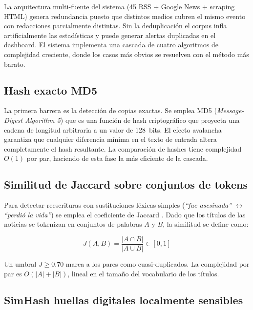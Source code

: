 La arquitectura multi-fuente del sistema (45 RSS + Google News + scraping HTML)
genera redundancia puesto que distintos medios cubren el mismo evento con
redacciones parcialmente distintas. Sin la deduplicación el corpus infla
artificialmente las estadísticas y puede generar alertas duplicadas en el dashboard.
El sistema implementa una cascada de cuatro algoritmos de complejidad creciente,
donde los casos más obvios se resuelven con el método más barato.

\subsection{Hash exacto MD5}
\label{subsec:mt_md5}

La primera barrera es la detección de copias exactas. Se emplea MD5
(\textit{Message-Digest Algorithm 5}) \cite{rivest1992md5} que es una función de hash
criptográfico que proyecta una cadena de longitud arbitraria a un valor de 128~bits.
El efecto avalancha garantiza que cualquier diferencia mínima en el texto de entrada
altera completamente el hash resultante. La comparación de hashes tiene complejidad
$O(1)$ por par, haciendo de esta fase la más eficiente de la cascada.


\subsection{Similitud de Jaccard sobre conjuntos de tokens}
\label{subsec:mt_jaccard}


Para detectar reescrituras con sustituciones léxicas simples (\textit{``fue
asesinada''} $\leftrightarrow$ \textit{``perdió la vida''}) se emplea el
coeficiente de Jaccard \cite{jaccard1912distribution}. Dado que los títulos de
las noticias se tokenizan en conjuntos de palabras $A$ y $B$, la similitud se
define como:

\begin{equation}
    J(A, B) = \frac{|A \cap B|}{|A \cup B|} \in [0, 1]
\end{equation}

Un umbral $J \geq 0.70$ marca a los pares como cuasi-duplicados. La complejidad
por par es $O(|A| + |B|)$, lineal en el tamaño del vocabulario de los títulos.


\subsection{SimHash huellas digitales localmente sensibles}
\label{subsec:mt_simhash}


